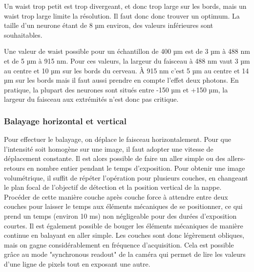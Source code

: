 
Un waist trop petit est trop divergeant, et donc trop large sur les bords, mais un waist trop large limite la résolution. Il faut donc donc trouver un optimum. La taille d'un neurone étant de 8 µm environ, des valeurs inférieures sont souhaitables.

Une valeur de waist possible pour un échantillon de 400 µm est de 3 µm à 488 nm et de 5 µm à 915 nm. Pour ces valeurs, la largeur du faisceau à 488 nm vaut 3 µm au centre et 10 µm sur les bords du cerveau. À 915 nm c'est 5 µm au centre et 14 µm sur les bords mais il faut aussi prendre en compte l'effet deux photons. En pratique, la plupart des neurones sont situés entre -150 µm et +150 µm, la largeur du faisceau aux extrémités n'est donc pas critique.

\subsubsection{Balayage horizontal et vertical}

Pour effectuer le balayage, on déplace le faisceau horizontalement. Pour que l'intensité soit homogène sur une image, il faut adopter une vitesse de déplacement constante. Il est alors possible de faire un aller simple ou des allers-retours en nombre entier pendant le temps d'exposition. Pour obtenir une image volumétrique, il suffit de répéter l'opération pour plusieurs couches, en changeant le plan focal de l'objectif de détection et la position vertical de la nappe. Procéder de cette manière couche après couche force à attendre entre deux couches pour laisser le temps aux éléments mécaniques de se positionner, ce qui prend un temps (environ 10 ms) non négligeable pour des durées d'exposition courtes. Il est également possible de bouger les éléments mécaniques de manière continue en balayant en aller simple. Les couches sont donc légèrement obliques, mais on gagne considérablement en fréquence d'acquisition. Cela est possible grâce au mode "synchronous readout" de la caméra qui permet de lire les valeurs d'une ligne de pixels tout en exposant une autre.


